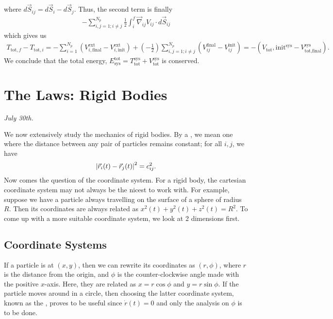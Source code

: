 where $d\vec{S}_{ij} = d\vec{S}_{i} - d\vec{S}_{j}$. Thus, the second term is finally
\begin{align}
    -\sum_{i,j=1;i \neq j}^{N_{p}} \frac{1}{2} \int_{i}^{f} \vec{\nabla}_{ij} V_{ij} \cdot d\vec{S}_{ij}
\end{align}
which gives us
\begin{align}
    T_{\text{tot},f} - T_{\text{tot},i} = -\sum_{i=1}^{N_{p}} \left( V_{i,\text{final}}^{\text{ext}} - V_{i,\text{init}}^{\text{ext}} \right) + (-\frac{1}{2}) \sum_{i,j=1;i \neq j}^{N_{p}} (V_{ij}^{\text{final}}-V_{ij}^{\text{init}}) = -(V_{\text{tot}},\text{init}^{\text{sys}} - V_{\text{tot},\text{final}}^{\text{sys}}).
\end{align}
We conclude that the total energy, $E_{\text{sys}}^{\text{tot}} = T_{\text{tot}}^{\text{sys}} + V_{\text{tot}}^{\text{sys}}$ is conserved.

\section{The Laws: Rigid Bodies}
\textit{July 30th.}

We now extensively study the mechanics of rigid bodies. By a , we mean one where the distance between any pair of particles remains constant; for all $i,j$, we have
\begin{align}
    \left| \vec{r}_{i}(t)-\vec{r}_{j}(t) \right|^{2} = c_{ij}^{2}.
\end{align}
Now comes the question of the coordinate system. For a rigid body, the cartesian coordinate system may not always be the nicest to work with. For example, suppose we have a particle always travelling on the surface of a sphere of radius $R$. Then its coordinates are always related as $x^{2}(t)+y^{2}(t)+z^{2}(t) = R^{2}$. To come up with a more suitable coordinate system, we look at 2 dimensions first.


\subsection{Coordinate Systems}
If a particle is at $(x,y)$, then we can rewrite its coordinates as $(r,\phi)$, where $r$ is the distance from the origin, and $\phi$ is the counter-clockwise angle made with the positive $x$-axis. Here, they are related as $x = r \cos \phi$ and $y = r \sin \phi$. If the particle moves around in a circle, then choosing the latter coordinate system, known as the , proves to be useful since $\dot{r}(t) = 0$ and only the analysis on $\phi$ is to be done.

